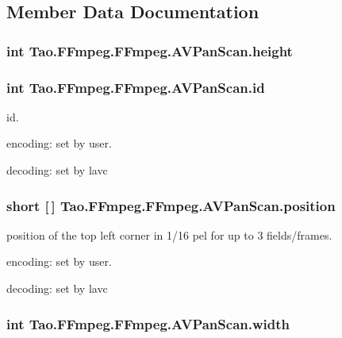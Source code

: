 \subsection{Member Data Documentation}
\hypertarget{struct_tao_1_1_f_fmpeg_1_1_f_fmpeg_1_1_a_v_pan_scan_a7273d0baeb1d6fcca7fd900f897752f2}{
\subsubsection[{height}]{\setlength{\rightskip}{0pt plus 5cm}int {\bf Tao.FFmpeg.FFmpeg.AVPanScan.height}}}
\label{struct_tao_1_1_f_fmpeg_1_1_f_fmpeg_1_1_a_v_pan_scan_a7273d0baeb1d6fcca7fd900f897752f2}
\hypertarget{struct_tao_1_1_f_fmpeg_1_1_f_fmpeg_1_1_a_v_pan_scan_a7b94b0066e2b134cdb1a9f2ba98085b0}{
\subsubsection[{id}]{\setlength{\rightskip}{0pt plus 5cm}int {\bf Tao.FFmpeg.FFmpeg.AVPanScan.id}}}
\label{struct_tao_1_1_f_fmpeg_1_1_f_fmpeg_1_1_a_v_pan_scan_a7b94b0066e2b134cdb1a9f2ba98085b0}
id.
\begin{DoxyItemize}
\item encoding: set by user.
\item decoding: set by lavc 
\end{DoxyItemize}\hypertarget{struct_tao_1_1_f_fmpeg_1_1_f_fmpeg_1_1_a_v_pan_scan_a68e2810434264ddda26437a4dacd3478}{
\subsubsection[{position}]{\setlength{\rightskip}{0pt plus 5cm}short \mbox{[}$\,$\mbox{]} {\bf Tao.FFmpeg.FFmpeg.AVPanScan.position}}}
\label{struct_tao_1_1_f_fmpeg_1_1_f_fmpeg_1_1_a_v_pan_scan_a68e2810434264ddda26437a4dacd3478}
position of the top left corner in 1/16 pel for up to 3 fields/frames.
\begin{DoxyItemize}
\item encoding: set by user.
\item decoding: set by lavc 
\end{DoxyItemize}\hypertarget{struct_tao_1_1_f_fmpeg_1_1_f_fmpeg_1_1_a_v_pan_scan_a5b6b3ba6fed75218cebb4edd6113643a}{
\subsubsection[{width}]{\setlength{\rightskip}{0pt plus 5cm}int {\bf Tao.FFmpeg.FFmpeg.AVPanScan.width}}}
